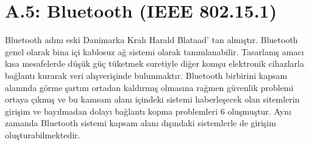 \clearpage
\section{A.5: Bluetooth (IEEE 802.15.1) }
\label{CH:AltBolum1.5}

	Bluetooth adını eski Danimarka Kralı Harald Blataad’ tan almıştır. Bluetooth genel olarak bina içi kablosuz ağ sistemi olarak tanımlanabilir. Tasarlanış amacı kısa mesafelerde düşük güç tüketmek suretiyle diğer komşu elektronik cihazlarla bağlantı kurarak veri alışverişinde bulunmaktır. Bluetooth birbirini kapsam alanında görme şartını ortadan kaldırmış olmasına rağmen güvenlik problemi ortaya çıkmış ve bu kamsam alanı içindeki sistemi haberleşecek olan sitemlerin girişim ve bayılmadan dolayı bağlantı kopma problemleri 6 oluşmuştur. Aynı zamanda Bluetooth sistemi kapsam alanı dışındaki sistemlerle de girişim oluşturabilmektedir.
